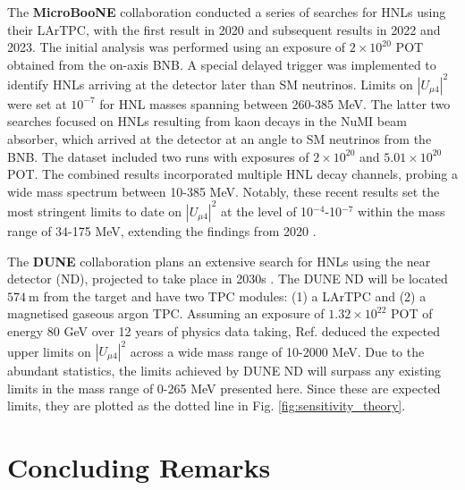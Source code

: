\begin{coloritemize}
\item The \textbf{MicroBooNE} collaboration conducted a series of searches for HNLs using their LArTPC, with the first result in 2020 and subsequent results in 2022 and 2023.
The initial analysis was performed using an exposure of $2 \times 10^{20}$ POT obtained from the on-axis BNB.
A special delayed trigger was implemented to identify HNLs arriving at the detector later than SM neutrinos.
Limits on $|U_{\mu4}|^{2}$ were set at $10^{-7}$ for HNL masses spanning between 260-385 MeV.
The latter two searches focused on HNLs resulting from kaon decays in the NuMI beam absorber, which arrived at the detector at an angle to SM neutrinos from the BNB.
The dataset included two runs with exposures of $2 \times 10^{20}$ and $5.01 \times 10^{20}$ POT.
The combined results incorporated multiple HNL decay channels, probing a wide mass spectrum between 10-385 MeV.
Notably, these recent results set the most stringent limits to date on $|U_{\mu4}|^{2}$ at the level of 10$^{-4}$-10$^{-7}$ within the mass range of 34-175 MeV, extending the findings from 2020 \cite{uboone1, uboone2, uboone3}.

\item The \textbf{DUNE} collaboration plans an extensive search for HNLs using the near detector (ND), projected to take place in 2030s \cite{DUNEND, HNLSilvia, HNLKelly}.
The DUNE ND will be located $574~\mathrm{m}$ from the target and have two TPC modules: (1) a LArTPC and (2) a magnetised gaseous argon TPC.
Assuming an exposure of $1.32 \times 10^{22}$ POT of energy 80 GeV over 12 years of physics data taking, Ref. \cite{HNLSilvia} deduced the expected upper limits on $|U_{\mu4}|^{2}$ across a wide mass 
range of 10-2000 MeV.
Due to the abundant statistics, the limits achieved by DUNE ND will surpass any existing limits in the mass range of 0-265 MeV presented here.
Since these are expected limits, they are plotted as the dotted line in Fig. \ref{fig:sensitivity_theory}.

\end{coloritemize}

\section{Concluding Remarks}
\label{sec2conclude}


